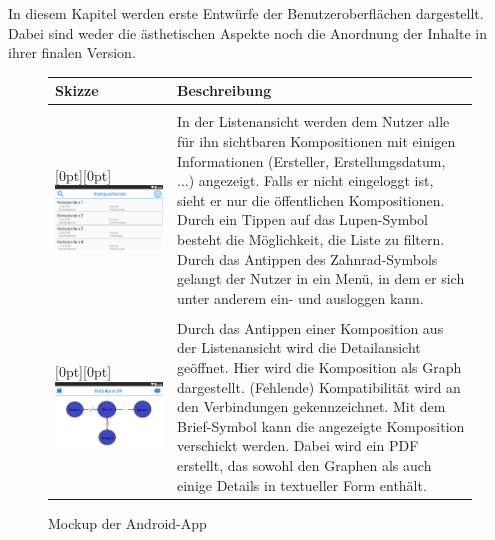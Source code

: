 In diesem Kapitel werden erste Entwürfe der Benutzeroberflächen dargestellt. Dabei sind weder die ästhetischen Aspekte noch die Anordnung der Inhalte in ihrer finalen Version. 

\begin{figure}[h]
	\centering
	
	\begin{tabularx}{\textwidth}{ p{} | X }
		\textbf{Skizze} & \textbf{Beschreibung} 
		
		\\ \hline \\
		
		\raisebox{-.9\height}[0pt][0pt]{\includegraphics[width=.5\textwidth]{img/mockup_list}}
		\label{fig:mock-list} 
		
		&In der Listenansicht werden dem Nutzer alle für ihn sichtbaren Kompositionen mit einigen Informationen (Ersteller, Erstellungsdatum, ...) angezeigt. Falls er nicht eingeloggt ist, sieht er nur die öffentlichen Kompositionen. Durch ein Tippen auf das Lupen-Symbol besteht die Möglichkeit, die Liste zu filtern. Durch das Antippen des Zahnrad-Symbols gelangt der Nutzer in ein Menü, in dem er sich unter anderem ein- und ausloggen kann.
				
		\\ \hline \\
		\raisebox{-.9\height}[0pt][0pt]{\includegraphics[width=.5\textwidth]{img/mockup_detail}}
		\label{fig:mock-detail} 
		
		& 
		Durch das Antippen einer Komposition aus der Listenansicht wird die Detailansicht geöffnet. Hier wird die Komposition als Graph dargestellt. (Fehlende) Kompatibilität wird an den Verbindungen gekennzeichnet. Mit dem Brief-Symbol kann die angezeigte Komposition verschickt werden.  Dabei wird ein PDF erstellt, das sowohl den Graphen als auch einige Details in textueller Form enthält. 
		
	\end{tabularx}
	
	\caption{Mockup der Android-App}
	\label{fig:app-mockup}
\end{figure}
